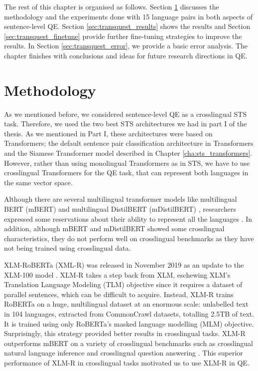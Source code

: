 The rest of this chapter is organised as follows. Section \ref{sec:transquest_method} discusses the methodology and the experiments done with 15 language pairs in both aspects of sentence-level QE.  Section \ref{sec:transquest_results} shows the results and Section \ref{sec:transquest_finetune} provide further fine-tuning strategies to improve the results. In Section \ref{sec:transquest_error}, we provide a basic error analysis. The chapter finishes with conclusions and ideas for future research directions in QE.

\section{Methodology}
\label{sec:transquest_method}
As we mentioned before, we considered sentence-level QE as a crosslingual STS task. Therefore, we used the two best STS architectures we had in part I of the thesis. As we mentioned in Part I, these architectures were based on Transformers; the default sentence pair classification architecture in Transformers and the Siamese Transformer model described in Chapter \ref{cha:sts_transformers}. However, rather than using monolingual Transformers as in STS, we have to use crosslingual Transformers for the QE task, that can represent both languages in the same vector space.

Although there are several multilingual transformer models like multilingual BERT (mBERT) \autocite{devlin-etal-2019-bert} and multilingual DistilBERT (mDistilBERT) \autocite{Sanh2019DistilBERTAD}, researchers expressed some reservations about their ability to represent all the languages \autocite{pires-etal-2019-multilingual}. In addition, although mBERT and mDistilBERT showed some crosslingual characteristics, they do not perform well on crosslingual benchmarks \autocite{karthikeyan2020cross} as they have not being trained using crosslingual data. 

XLM-RoBERTa (XML-R) was released in November 2019 \autocite{conneau-etal-2020-unsupervised} as an update to the XLM-100 model \autocite{lample2019cross}. XLM-R takes a step back from XLM, eschewing XLM's Translation Language Modeling (TLM) objective since it requires a dataset of parallel sentences, which can be difficult to acquire. Instead, XLM-R trains RoBERTa\autocite{liu2019roberta} on a huge, multilingual dataset at an enormous scale: unlabelled text in 104 languages, extracted from CommonCrawl datasets, totalling 2.5TB of text. It is trained using only RoBERTa's \autocite{liu2019roberta} masked language modelling (MLM) objective. Surprisingly, this strategy provided better results in crosslingual tasks. XLM-R outperforms mBERT on a variety of crosslingual benchmarks such as crosslingual natural language inference and crosslingual question answering \autocite{conneau-etal-2020-unsupervised}. This superior performance of XLM-R in crosslingual tasks motivated us to use XLM-R in QE. 

